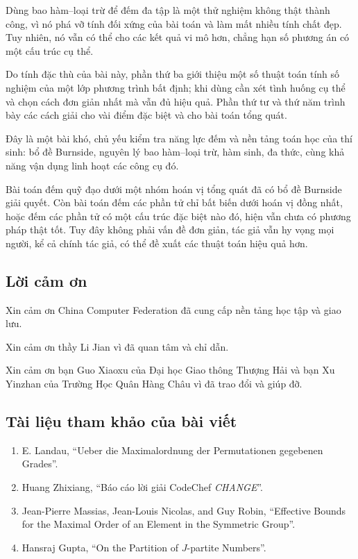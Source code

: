 \documentclass[11pt]{article}
\begin{document}
Dùng bao hàm--loại trừ để đếm đa tập là một thử nghiệm không thật thành công,
vì nó phá vỡ tính đối xứng của bài toán và làm mất nhiều tính chất đẹp. Tuy
nhiên, nó vẫn có thể cho các kết quả vi mô hơn, chẳng hạn số phương án có một
cấu trúc cụ thể.

Do tính đặc thù của bài này, phần thứ ba giới thiệu một số thuật toán tính số
nghiệm của một lớp phương trình bất định; khi dùng cần xét tình huống cụ thể và
chọn cách đơn giản nhất mà vẫn đủ hiệu quả. Phần thứ tư và thứ năm trình bày
các cách giải cho vài điểm đặc biệt và cho bài toán tổng quát.

Đây là một bài khó, chủ yếu kiểm tra năng lực đếm và nền tảng toán học của thí
sinh: bổ đề Burnside, nguyên lý bao hàm--loại trừ, hàm sinh, đa thức, cùng khả
năng vận dụng linh hoạt các công cụ đó.

Bài toán đếm quỹ đạo dưới một nhóm hoán vị tổng quát đã có bổ đề Burnside giải
quyết. Còn bài toán đếm các phần tử chỉ bất biến dưới hoán vị đồng nhất, hoặc
đếm các phần tử có một cấu trúc đặc biệt nào đó, hiện vẫn chưa có phương pháp
thật tốt. Tuy đây không phải vấn đề đơn giản, tác giả vẫn hy vọng mọi người, kể
cả chính tác giả, có thể đề xuất các thuật toán hiệu quả hơn.

\subsection{Lời cảm ơn}

Xin cảm ơn China Computer Federation đã cung cấp nền tảng học tập và giao lưu.

Xin cảm ơn thầy Li Jian vì đã quan tâm và chỉ dẫn.

Xin cảm ơn bạn Guo Xiaoxu của Đại học Giao thông Thượng Hải và bạn Xu Yinzhan
của Trường Học Quân Hàng Châu vì đã trao đổi và giúp đỡ.

\subsection*{Tài liệu tham khảo của bài viết}

\begin{enumerate}
  \item E. Landau, ``Ueber die Maximalordnung der Permutationen gegebenen Grades''.
  \item Huang Zhixiang, ``Báo cáo lời giải CodeChef \emph{CHANGE}''.
  \item Jean-Pierre Massias, Jean-Louis Nicolas, and Guy Robin, ``Effective Bounds
  for the Maximal Order of an Element in the Symmetric Group''.
  \item Hansraj Gupta, ``On the Partition of \(J\)-partite Numbers''.
\end{enumerate}
\end{document}
